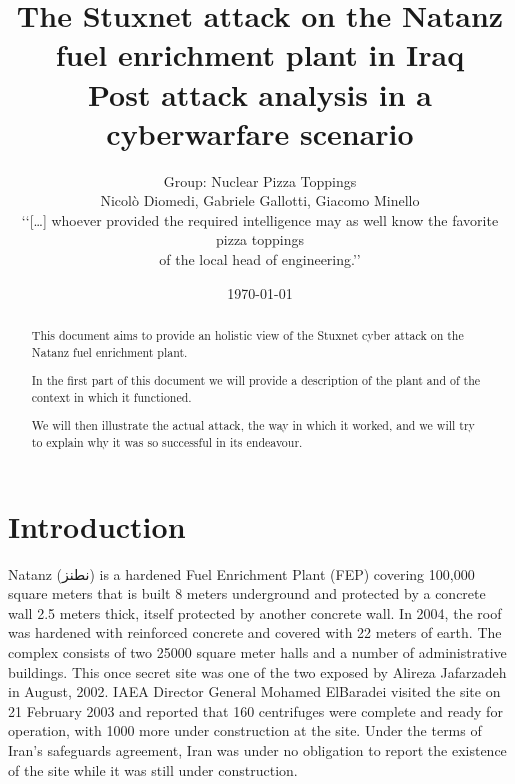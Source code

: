 \documentclass[12pt]{article}
\title{The Stuxnet attack on the Natanz fuel enrichment plant in Iraq\\
\large{Post attack analysis in a cyberwarfare scenario}}
\author{Group: Nuclear Pizza Toppings \\
Nicolò Diomedi, Gabriele Gallotti, Giacomo Minello
\\
\scriptsize‘‘[…] whoever provided the required intelligence may as well know the favorite pizza toppings \\
\scriptsize of the local head of engineering.’’\cite{killcentrifuge}
\\
}
\date{\today}
\begin{document}
\begin{titlepage}
\maketitle
\begin{abstract}
\noindent  This document aims to provide an holistic view of the Stuxnet cyber attack on the Natanz fuel enrichment plant.

\noindent In the first part of this document we will provide a description of the plant and of the context in which it functioned.

\noindent We will then illustrate the actual attack, the way in which it worked, and we will try to explain why it was so successful in its endeavour.
\end{abstract}
\end{titlepage}


\tableofcontents

\listoffigures

\newpage

\section{Introduction}
Natanz ({نطنز}) is a hardened Fuel Enrichment Plant (FEP) covering 100,000 square meters that is built 8 meters underground and protected by a concrete wall 2.5 meters thick, itself protected by another concrete wall. In 2004, the roof was hardened with reinforced concrete and covered with 22 meters of earth. The complex consists of two 25000 square meter halls and a number of administrative buildings. This once secret site was one of the two exposed by Alireza Jafarzadeh in August, 2002. IAEA Director General Mohamed ElBaradei visited the site on 21 February 2003 and reported that 160 centrifuges were complete and ready for operation, with 1000 more under construction at the site. Under the terms of Iran’s safeguards agreement, Iran was under no obligation to report the existence of the site while it was still under construction.
\end{document}
